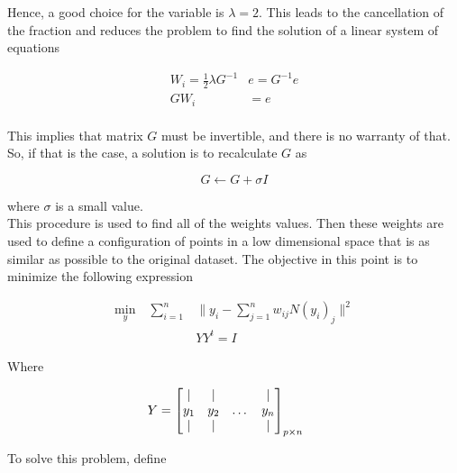 \documentclass[12pt,journal]{IEEEtran}
\begin{document}
    Hence, a good choice for the variable is $\lambda = 2$. This leads to the
    cancellation of the fraction and reduces the problem to find the solution of
    a linear system of equations

    \begin{equation*}
        \begin{aligned}
            W_i = \frac{1}{2} \lambda G^{-1} & e = G^{-1} e \\
            G W_i &= e \\
        \end{aligned}
    \end{equation*}

    This implies that matrix $G$ must be invertible, and there is no warranty
    of that. So, if that is the case, a solution is to recalculate $G$ as

    \begin{equation*}
        G \leftarrow G + \sigma I
    \end{equation*}

    where $\sigma$ is a small value.\\

    This procedure is used to find all of the weights values. Then these weights
    are used to define a configuration of points in a low dimensional space that
    is as similar as possible to the original dataset. The objective in this
    point is to minimize the following expression

    \begin{equation*}
        \begin{aligned}
            \underset{y}{\text{min}} \quad \sum_{i=1}^n & \lVert y_i - \sum_{j=1}^n w_{ij} N(y_i)_j \rVert^2 \\
            & YY^t = I
        \end{aligned}
    \end{equation*}

    Where

    \[
        Y =
        \begin{bmatrix}
            |   &  |  &       & |   \\
            y_1 & y_2 & \dots & y_n \\
            |   &  |  &       & |
        \end{bmatrix}_{p \times n}
        \hspace{0.5cm}
    \]

    To solve this problem, define
\end{document}
